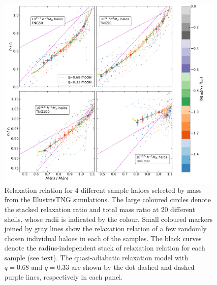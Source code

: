 \begin{figure}
    \centering
    \includegraphics[width=\linewidth,trim={0 0 0cm 0},clip]{plots/indv_relx-reln_all.pdf}
    \caption{Relaxation relation for 4 different sample haloes selected by mass from the IllustrisTNG simulations. The large coloured circles denote the stacked relaxation ratio and total mass ratio at 20 different shells, whose radii is indicated by the colour. Small coloured markers joined by gray lines show the relaxation relation of a few randomly chosen individual haloes in each of the samples. The black curves denote the radius-independent stack of relaxation relation for each sample (see text). The quasi-adiabatic relaxation model  with $q=0.68$ and $q=0.33$ are shown by the dot-dashed and dashed purple lines, respectively in each panel.} 
    \label{fig:relx-results-simple-ch:z0main}
\end{figure}




